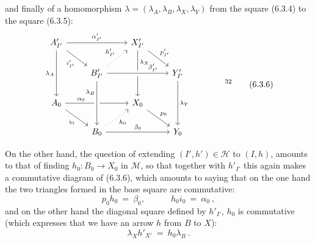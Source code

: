 and finally of a homomorphism $\lambda = (\lambda_A, \lambda_B, \lambda_X, \lambda_Y)$ from the square (6.3.4) to the square (6.3.5):
\[
\begin{tikzcd}
A'_{I'} \arrow[rr, "\alpha'_{I'}"] \arrow[dr, "i'_{I'}"'] \arrow[dd, "\lambda_A"'] & & X'_{I'} \arrow[dr, "p'_{I'}"] \arrow[dd, "\lambda_X" near start] & \\
 & B'_{I'} \arrow[ur, dotted, "h'_{I'}"] \arrow[rr, crossing over, "\beta'_{I'}" near end] & & Y'_{I'} \arrow[dd, "\lambda_Y"] \\
A_0 \arrow[rr, "\alpha_0" near start] \arrow[dr, "i_0"'] & & X_0 \arrow[dr, "p_0"] & \\
 & B_0 \arrow[from=2-2, crossing over, "\lambda_B"' near start] \arrow[ur, dotted, "h_0"'] \arrow[rr, "\beta_0"] & & Y_0
\end{tikzcd}
\qquad\qquad \text{\footnotemark[32]}
\tag*{(6.3.6)}
\]

On the other hand, the question of extending $(I', h') \in \mathcal{H}$ to $(I, h)$, amounts to that of finding $h_0 : B_0 \longrightarrow X_0$ in $\mathcal{M}$, so that together with $h'_{I'}$ this again makes a commutative diagram of (6.3.6), which amounts to saying that on the one hand the two triangles formed in the base square are commutative:
\[
p_0h_0 \ =\ \beta_0, \qquad\quad h_0i_0 \ =\ \alpha_0\ ,
\tag*{(6.3.7)}
\]
and on the other hand the diagonal square defined by $h'_{I'}$, $h_0$ is commutative (which expresses that we have an arrow $h$ from $B$ to $X$):
\[
\lambda_X h'_{X'} \ =\ h_0\lambda_B\ . %
\tag*{(6.3.8)}
\]

